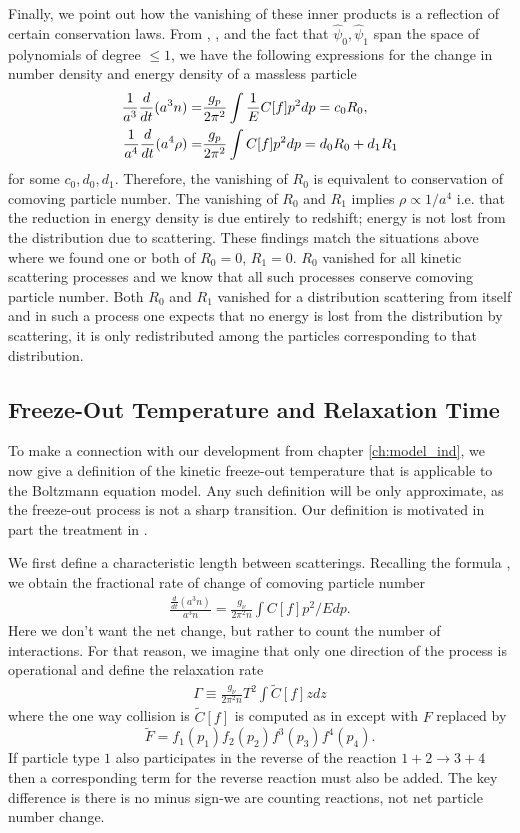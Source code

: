 Finally, we point out how the vanishing of these inner products is a reflection of certain conservation laws. From , , and the fact that $\hat\psi_0,\hat\psi_1$ span the space of polynomials of degree $\leq 1$, we have the following expressions for the change in number density and energy density of a massless particle
\begin{align}
\frac{1}{a^3} \frac{d}{dt}(a^3n)=&\frac{g_p}{2\pi^2}\int \frac{1}{E}C[f]p^2dp=c_0 R_0,\\
\frac{1}{a^4}\frac{d}{dt}(a^4\rho)=&\frac{g_p}{2\pi^2}\int C[f] p^2dp=d_0R_0+d_1R_1\notag
\end{align}
for some $c_0,d_0,d_1$. Therefore, the vanishing of $R_0$ is equivalent to conservation of comoving particle number.  The vanishing of $R_0$ and $R_1$ implies $\rho\propto 1/a^4$ i.e. that the reduction in energy density is due entirely to redshift; energy is not lost from the distribution due to scattering.  These findings match the situations above where we found one or both of $R_0=0$, $R_1=0$.  $R_0$ vanished for all kinetic scattering processes and we know that all such processes conserve comoving particle number.  Both $R_0$ and $R_1$ vanished for a distribution scattering from itself and in such a process one expects that no energy is lost from the distribution by scattering, it is only redistributed among the particles corresponding to that distribution.


\subsection{Freeze-Out Temperature and Relaxation Time}
To make a connection with our development from chapter \ref{ch:model_ind}, we now give a definition of the kinetic freeze-out temperature that is applicable to the Boltzmann equation model. Any such definition will be only approximate, as the freeze-out process is not a sharp transition.  Our definition is motivated in part the treatment in \cite{kolb}. 

We first define a characteristic length between scatterings. Recalling the formula , we obtain the fractional rate of change of comoving particle number
\begin{align}
\frac{\frac{d}{dt}(a^3 n)}{a^3n}=\frac{g_\nu}{2\pi^2n}\int C[f]p^2/Edp.
\end{align}
Here we don't want the net change, but rather to count the number of interactions.  For that reason, we imagine that only one direction of the process is operational and define the relaxation rate
\begin{align}
\Gamma\equiv\frac{g_\nu}{2\pi^2n}T^2\int \tilde C[f]zdz
\end{align}
where the one way collision is $\tilde C[f]$ is computed as in  except with $F$ replaced by 
\begin{equation}
\tilde F=f_1(p_1)f_2(p_2)f^3(p_3)f^4(p_4).
\end{equation}
If particle type $1$ also participates in the reverse of the reaction $1+2\rightarrow 3+4$ then a corresponding term for the reverse reaction must also be added.  The key difference is there is no minus sign-we are counting reactions, not net particle number change.

